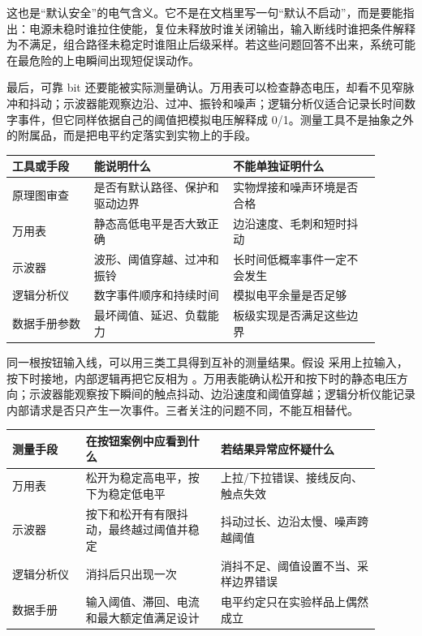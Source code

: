 这也是“默认安全”的电气含义。它不是在文档里写一句“默认不启动”，而是要能指出：电源未稳时谁拉住使能，复位未释放时谁关闭输出，输入断线时谁把条件解释为不满足，组合路径未稳定时谁阻止后级采样。若这些问题回答不出来，系统可能在最危险的上电瞬间出现短促误动作。

最后，可靠 bit 还要能被实际测量确认。万用表可以检查静态电压，却看不见窄脉冲和抖动；示波器能观察边沿、过冲、振铃和噪声；逻辑分析仪适合记录长时间数字事件，但它同样依据自己的阈值把模拟电压解释成 0/1。测量工具不是抽象之外的附属品，而是把电平约定落实到实物上的手段。

\begin{longtable}{L{0.2\linewidth}L{0.34\linewidth}L{0.36\linewidth}}
\toprule
工具或手段 & 能说明什么 & 不能单独证明什么 \\
\midrule
原理图审查 & 是否有默认路径、保护和驱动边界 & 实物焊接和噪声环境是否合格 \\\tablerowrule
万用表 & 静态高低电平是否大致正确 & 边沿速度、毛刺和短时抖动 \\\tablerowrule
示波器 & 波形、阈值穿越、过冲和振铃 & 长时间低概率事件一定不会发生 \\\tablerowrule
逻辑分析仪 & 数字事件顺序和持续时间 & 模拟电平余量是否足够 \\\tablerowrule
数据手册参数 & 最坏阈值、延迟、负载能力 & 板级实现是否满足这些边界 \\
\bottomrule
\end{longtable}

同一根按钮输入线，可以用三类工具得到互补的测量结果。假设  采用上拉输入，按下时接地，内部逻辑再把它反相为 。万用表能确认松开和按下时的静态电压方向；示波器能观察按下瞬间的触点抖动、边沿速度和阈值穿越；逻辑分析仪能记录内部请求是否只产生一次事件。三者关注的问题不同，不能互相替代。

\begin{longtable}{L{0.18\linewidth}L{0.33\linewidth}L{0.39\linewidth}}
\toprule
测量手段 & 在按钮案例中应看到什么 & 若结果异常应怀疑什么 \\
\midrule
万用表 & 松开为稳定高电平，按下为稳定低电平 & 上拉/下拉错误、接线反向、触点失效 \\\tablerowrule
示波器 & 按下和松开有有限抖动，最终越过阈值并稳定 & 抖动过长、边沿太慢、噪声跨越阈值 \\\tablerowrule
逻辑分析仪 & 消抖后只出现一次  & 消抖不足、阈值设置不当、采样边界错误 \\\tablerowrule
数据手册 & 输入阈值、滞回、电流和最大额定值满足设计 & 电平约定只在实验样品上偶然成立 \\
\bottomrule
\end{longtable}

